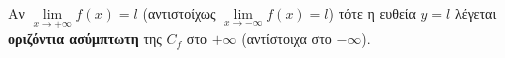 Αν $ \lim\limits_{x\to +\infty}{f(x)}=l $ (αντιστοίχως $ \lim\limits_{x\to -\infty}{f(x)}=l $) τότε η ευθεία $ y=l $ λέγεται \textbf{οριζόντια ασύμπτωτη} της $ C_f $ στο $ +\infty $ (αντίστοιχα στο $ -\infty $).
